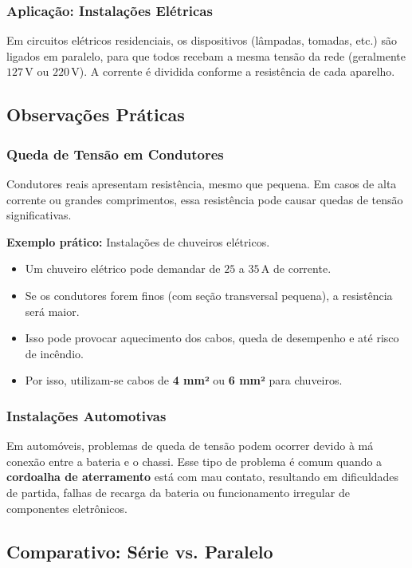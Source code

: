 \subsubsection{Aplicação: Instalações Elétricas}
Em circuitos elétricos residenciais, os dispositivos (lâmpadas, tomadas, etc.) são ligados em paralelo, para que todos recebam a mesma tensão da rede (geralmente $127\,\text{V}$ ou $220\,\text{V}$). A corrente é dividida conforme a resistência de cada aparelho.

\subsection{Observações Práticas}
\subsubsection{Queda de Tensão em Condutores}
Condutores reais apresentam resistência, mesmo que pequena. Em casos de alta corrente ou grandes comprimentos, essa resistência pode causar quedas de tensão significativas.

\textbf{Exemplo prático:} Instalações de chuveiros elétricos.

\begin{itemize}
    \item Um chuveiro elétrico pode demandar de $25$ a $35\,\text{A}$ de corrente.
    \item Se os condutores forem finos (com seção transversal pequena), a resistência será maior.
    \item Isso pode provocar aquecimento dos cabos, queda de desempenho e até risco de incêndio.
    \item Por isso, utilizam-se cabos de \textbf{4 mm²} ou \textbf{6 mm²} para chuveiros.
\end{itemize}

\subsubsection{Instalações Automotivas}
Em automóveis, problemas de queda de tensão podem ocorrer devido à má conexão entre a bateria e o chassi. Esse tipo de problema é comum quando a \textbf{cordoalha de aterramento} está com mau contato, resultando em dificuldades de partida, falhas de recarga da bateria ou funcionamento irregular de componentes eletrônicos.

\subsection{Comparativo: Série vs. Paralelo}

